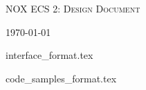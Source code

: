 \documentclass[hidelinks]{article}
\begin{document}
\begin{titlepage}
    \centering
    {\scshape\LARGE NOX ECS 2: Design Document \par}
    \vfill
    {\large \today\par}
\end{titlepage}

\tableofcontents
\pagebreak

{interface_format.tex}

\pagebreak



\pagebreak
{code_samples_format.tex}
\end{document}

